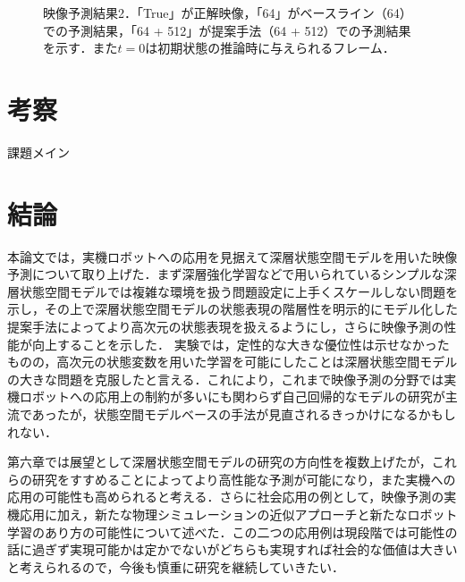 \documentclass[10pt, twocolumn]{jarticle}
\begin{document}
\begin{figure}[tp]
{    \label{fig:pred_d}}
    \caption[映像予測結果2]{映像予測結果2．「True」が正解映像，「64」がベースライン（64）での予測結果，「64 + 512」が提案手法（64 + 512）での予測結果を示す．また$t = 0$は初期状態の推論時に与えられるフレーム．}
    \label{fig:compare_cd}
\end{figure}


\section{考察}
課題メイン

\section{結論}

本論文では，実機ロボットへの応用を見据えて深層状態空間モデルを用いた映像予測について取り上げた．まず深層強化学習などで用いられているシンプルな深層状態空間モデルでは複雑な環境を扱う問題設定に上手くスケールしない問題を示し，その上で深層状態空間モデルの状態表現の階層性を明示的にモデル化した提案手法によってより高次元の状態表現を扱えるようにし，さらに映像予測の性能が向上することを示した．
実験では，定性的な大きな優位性は示せなかったものの，高次元の状態変数を用いた学習を可能にしたことは深層状態空間モデルの大きな問題を克服したと言える．これにより，これまで映像予測の分野では実機ロボットへの応用上の制約が多いにも関わらず自己回帰的なモデルの研究が主流であったが，状態空間モデルベースの手法が見直されるきっかけになるかもしれない．

第六章では展望として深層状態空間モデルの研究の方向性を複数上げたが，これらの研究をすすめることによってより高性能な予測が可能になり，また実機への応用の可能性も高められると考える．さらに社会応用の例として，映像予測の実機応用に加え，新たな物理シミュレーションの近似アプローチと新たなロボット学習のあり方の可能性について述べた．この二つの応用例は現段階では可能性の話に過ぎず実現可能かは定かでないがどちらも実現すれば社会的な価値は大きいと考えられるので，今後も慎重に研究を継続していきたい．
\end{document}
